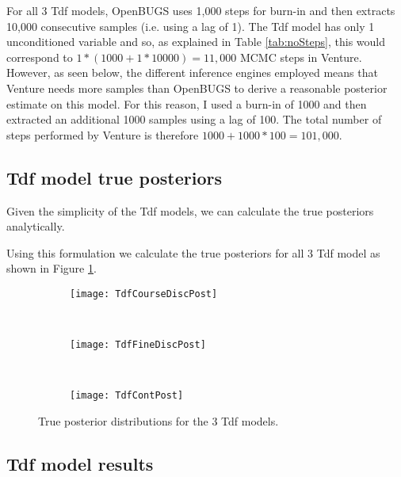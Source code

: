 For all 3 Tdf models, OpenBUGS uses 1,000 steps for burn-in and then extracts 10,000 consecutive samples (i.e. using a lag of 1). The Tdf model has only 1 unconditioned variable and so, as explained in Table \ref{tab:noSteps}, this would correspond to \( 1 * (1000 + 1 * 10000) = 11,000 \) MCMC steps in Venture. However, as seen below, the different inference engines employed means that Venture needs more samples than OpenBUGS to derive a reasonable posterior estimate on this model. For this reason, I used a burn-in of 1000 and then extracted an additional 1000 samples using a lag of 100. The total number of steps performed by Venture is therefore \( 1000 + 1000 * 100 = 101,000 \).

\subsection{Tdf model true posteriors}
\label{sect:truePost}

Given the simplicity of the Tdf models, we can calculate the true posteriors analytically.


Using this formulation we calculate the true posteriors for all 3 Tdf model as shown in Figure \ref{fig:tdfPosts}.

\begin{figure}[h]
        \centering
        \begin{subfigure}[b]{0.31\textwidth}
                \centering
                \texttt{[image: TdfCourseDiscPost]}
        \end{subfigure}
        ~ 
        \begin{subfigure}[b]{0.31\textwidth}
                \centering
                \texttt{[image: TdfFineDiscPost]}
        \end{subfigure}
        ~ 
        \begin{subfigure}[b]{0.31\textwidth}
                \centering
                \texttt{[image: TdfContPost]}
        \end{subfigure}
    \caption{True posterior distributions for the 3 Tdf models.}
    \label{fig:tdfPosts}
\end{figure}

\subsection{Tdf model results}

